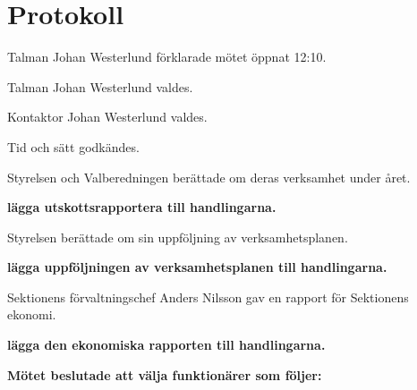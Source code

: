 \documentclass[10pt]{article}
\def\mo{Johan Westerlund}
\begin{document}
\section*{Protokoll}
\begin{paragrafer}
Talman {\mo} förklarade mötet öppnat 12:10.

Talman {\mo} valdes.

Kontaktor {\mo} valdes.

Tid och sätt godkändes.

\valavj






Styrelsen och Valberedningen berättade om deras verksamhet under året.

\textbf{\Mba lägga utskottsrapportera till handlingarna.}

Styrelsen berättade om sin uppföljning av verksamhetsplanen.

\textbf{\Mba lägga uppföljningen av verksamhetsplanen till handlingarna.}

Sektionens förvaltningschef Anders Nilsson gav en rapport för Sektionens ekonomi.

\textbf{\Mba lägga den ekonomiska rapporten till handlingarna.}

\begin{paragrafer}
    \textbf{Mötet beslutade att välja funktionärer som följer:}
\end{paragrafer}
\end{paragrafer}
\end{document}
